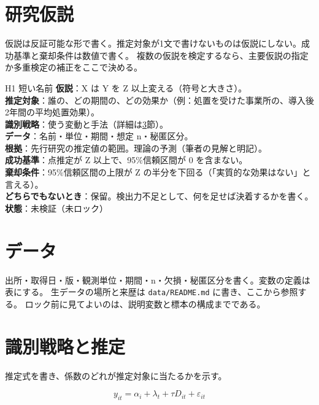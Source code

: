 \documentclass[a4paper,10pt]{ltjsarticle}
\begin{document}
\section{研究仮説}\label{sec:hyp}
仮説は反証可能な形で書く。推定対象が1文で書けないものは仮説にしない。成功基準と棄却条件は数値で書く。
複数の仮説を検定するなら、主要仮説の指定か多重検定の補正をここで決める。

\begin{hypothesis}{H1 短い名前}
\textbf{仮説}：X は Y を Z 以上変える（符号と大きさ）。\\
\textbf{推定対象}：誰の、どの期間の、どの効果か（例：処置を受けた事業所の、導入後2年間の平均処置効果）。\\
\textbf{識別戦略}：使う変動と手法（詳細は\ref{sec:design}節）。\\
\textbf{データ}：名前・単位・期間・想定 n・秘匿区分。\\
\textbf{根拠}：先行研究の推定値の範囲。理論の予測（筆者の見解と明記）。\\
\textbf{成功基準}：点推定が Z 以上で、95\%信頼区間が 0 を含まない。\\
\textbf{棄却条件}：95\%信頼区間の上限が Z の半分を下回る（「実質的な効果はない」と言える）。\\
\textbf{どちらでもないとき}：保留。検出力不足として、何を足せば決着するかを書く。\\
\textbf{状態}：未検証（未ロック）
\end{hypothesis}

\section{データ}\label{sec:data}
出所・取得日・版・観測単位・期間・n・欠損・秘匿区分を書く。変数の定義は表にする。
生データの場所と来歴は \texttt{data/README.md} に書き、ここから参照する。
ロック前に見てよいのは、説明変数と標本の構成までである。

\section{識別戦略と推定}\label{sec:design}
推定式を書き、係数のどれが推定対象に当たるかを示す。

\begin{equation}
  y_{it} = \alpha_i + \lambda_t + \tau D_{it} + \varepsilon_{it}
  \label{eq:main}
\end{equation}
\end{document}
